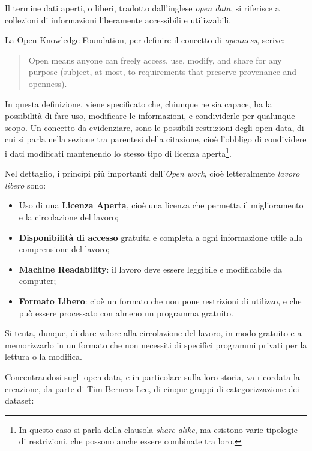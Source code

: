\documentclass[a4paper,12pt]{report}
\newcommand{\quotestyle}[1]{\textit{#1}}
\begin{document}
Il termine dati aperti, o liberi, tradotto dall'inglese \quotestyle{open data}, 
si riferisce a collezioni di informazioni liberamente accessibili e 
utilizzabili. 

La Open Knowledge Foundation, per definire il concetto di \quotestyle{openness}, 
scrive: 

\begin{quotation}
    Open means anyone can freely access, use, modify, and share for any purpose 
    (subject, at most, to requirements that preserve provenance and openness). \cite{OPENDEFINITION:1}
\end{quotation}

In questa definizione, viene specificato che, chiunque ne sia capace, ha la possibilità di 
fare uso, modificare le informazioni, e condividerle per qualunque scopo. 
Un concetto da evidenziare, sono le possibili restrizioni degli open data, 
di cui si parla nella sezione tra parentesi della citazione, 
cioè l'obbligo di condividere i dati modificati 
mantenendo lo stesso tipo di licenza 
aperta\footnote{In questo caso si parla della clausola \quotestyle{share alike}, ma 
esistono varie tipologie di restrizioni, che possono anche essere combinate tra loro.}. 

Nel dettaglio, i princìpi più importanti dell'\quotestyle{Open work}, 
cioè letteralmente \quotestyle{lavoro libero} sono: 

\begin{itemize}
    \item Uso di una \textbf{Licenza Aperta}, cioè una licenza che permetta 
    il miglioramento e la circolazione del lavoro;
    \item \textbf{Disponibilità di accesso} gratuita e completa a ogni informazione utile 
    alla comprensione del lavoro; 
    \item \textbf{Machine Readability}: il lavoro deve essere leggibile e modificabile da computer; 
    \item \textbf{Formato Libero}: cioè un formato che non pone restrizioni di utilizzo, 
    e che può essere processato con almeno un programma gratuito.
\end{itemize}

Si tenta, dunque, di dare valore alla circolazione del lavoro, in modo gratuito e
a memorizzarlo in un formato che non necessiti di specifici programmi privati 
per la lettura o la modifica.


Concentrandosi sugli open data, e in particolare sulla loro storia, 
va ricordata la creazione, da parte di 
Tim Berners-Lee, di cinque gruppi di categorizzazione dei dataset: 
\end{document}
